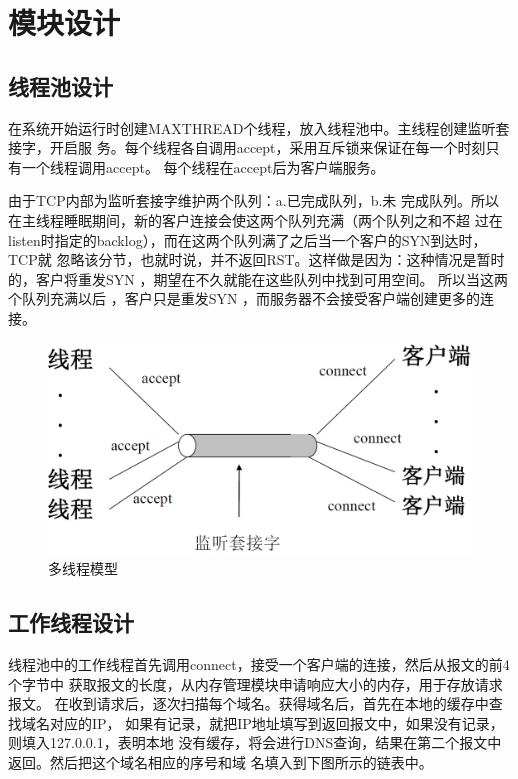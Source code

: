 

\section{模块设计}
\subsection{线程池设计} 
在系统开始运行时创建MAXTHREAD个线程，放入线程池中。主线程创建监听套接字，开启服
务。每个线程各自调用accept，采用互斥锁来保证在每一个时刻只有一个线程调用accept。
每个线程在accept后为客户端服务。
\par{由于TCP内部为监听套接字维护两个队列：a.已完成队列，b.未
完成队列。所以在主线程睡眠期间，新的客户连接会使这两个队列充满（两个队列之和不超
过在listen时指定的backlog），而在这两个队列满了之后当一个客户的SYN到达时，TCP就
忽略该分节，也就时说，并不返回RST。这样做是因为：这种情况是暂时的，客户将重发SYN
，期望在不久就能在这些队列中找到可用空间\cite{unpv1}。 所以当这两个队列充满以后
，客户只是重发SYN ，而服务器不会接受客户端创建更多的连接。}
\begin{figure}[H]
\centering
\includegraphics[keepaspectratio, scale=0.4]{pitures/xianchengmoxing.png}
\caption{多线程模型} 
\end{figure}
\subsection{工作线程设计}

线程池中的工作线程首先调用connect，接受一个客户端的连接，然后从报文的前4个字节中
获取报文的长度，从内存管理模块申请响应大小的内存，用于存放请求报文。
在收到请求后，逐次扫描每个域名。获得域名后，首先在本地的缓存中查找域名对应的IP，
如果有记录，就把IP地址填写到返回报文中，如果没有记录，则填入127.0.0.1，表明本地
没有缓存，将会进行DNS查询，结果在第二个报文中返回。然后把这个域名相应的序号和域
名填入到下图所示的链表中。

